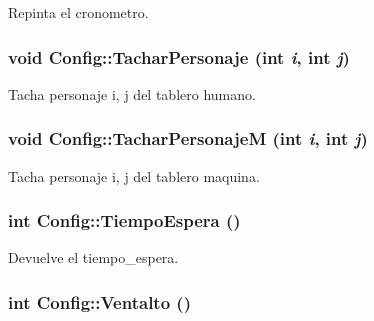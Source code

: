 Repinta el cronometro. 

\hypertarget{class_config_dc8163da35c14b46f65c79bdcfea4d6e}{
\subsubsection[{TacharPersonaje}]{\setlength{\rightskip}{0pt plus 5cm}void Config::TacharPersonaje (int {\em i}, \/  int {\em j})}}
\label{class_config_dc8163da35c14b46f65c79bdcfea4d6e}


Tacha personaje i, j del tablero humano. 

\hypertarget{class_config_b0ece1c4e60dc3fc432b70b710ec7c33}{
\subsubsection[{TacharPersonajeM}]{\setlength{\rightskip}{0pt plus 5cm}void Config::TacharPersonajeM (int {\em i}, \/  int {\em j})}}
\label{class_config_b0ece1c4e60dc3fc432b70b710ec7c33}


Tacha personaje i, j del tablero maquina. 

\hypertarget{class_config_d6ab8b5ecdb0602a9d3b6b70ed09f766}{
\subsubsection[{TiempoEspera}]{\setlength{\rightskip}{0pt plus 5cm}int Config::TiempoEspera ()}}
\label{class_config_d6ab8b5ecdb0602a9d3b6b70ed09f766}


Devuelve el tiempo\_\-espera. 

\hypertarget{class_config_db1372196f96192c9c8a77ff8c3147c7}{
\subsubsection[{Ventalto}]{\setlength{\rightskip}{0pt plus 5cm}int Config::Ventalto ()}}
\label{class_config_db1372196f96192c9c8a77ff8c3147c7}


